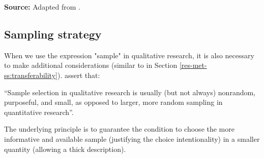 \begin{table}[ht]
  \par\medskip\ABNTEXfontereduzida\selectfont\textbf{Source:} Adapted from . \par\medskip
\end{table}

\subsection{Sampling strategy}
\label{res-met-ss:sampling-strategy}

When we use the expression "sample" in qualitative research, it is also necessary to make additional considerations (similar to in Section \ref{res-met-ss:transferability}).  assert that:
\begin{citacao}
    “Sample selection in qualitative research is usually (but not always) nonrandom, purposeful, and small, as opposed to larger, more random sampling in quantitative research”.
\end{citacao}
The underlying principle is to guarantee the condition to choose the more informative and available sample (justifying the choice intentionality) in a smaller quantity (allowing a thick description).

                

        

